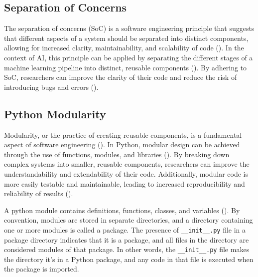 \documentclass{article}
\begin{document}
\subsection{Separation of Concerns}
The separation of concerns (SoC) is a software engineering principle that suggests that different aspects of a system should be separated into distinct components, allowing for increased clarity, maintainability, and scalability of code (\cite{pressman2010software, de2002importance}). In the context of AI, this principle can be applied by separating the different stages of a machine learning pipeline into distinct, reusable components (\cite{mo2016decoupling,mo2016decoupling,pressman2010software, de2002importance}). By adhering to SoC, researchers can improve the clarity of their code and reduce the risk of introducing bugs and errors (\cite{mo2016decoupling,mo2016decoupling,pressman2010software, de2002importance}).

\subsection{Python Modularity}
Modularity, or the practice of creating reusable components, is a fundamental aspect of software engineering (\cite{pressman2010software}). In Python, modular design can be achieved through the use of functions, modules, and libraries (\cite{sanner1999python}). By breaking down complex systems into smaller, reusable components, researchers can improve the understandability and extendability of their code. Additionally, modular code is more easily testable and maintainable, leading to increased reproducibility and reliability of results (\cite{amershi2019software,pressman2010software}).

A python module contains definitions, functions, classes, and variables (\cite{raschka2015python}). By convention, modules are stored in separate directories, and a directory containing one or more modules is called a package. The presence of \verb|__init__.py| file in a package directory indicates that it is a package, and all files in the directory are considered modules of that package. In other words, the \verb|__init__.py| file makes the directory it's in a Python package, and any code in that file is executed when the package is imported.

\end{document}
